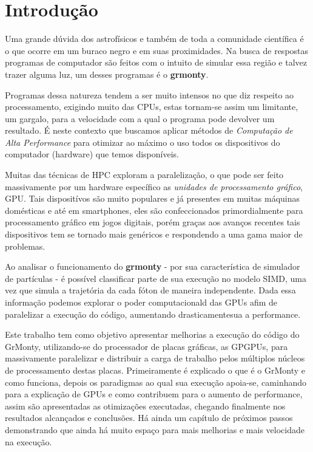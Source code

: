 \chapter{Introdução}
\label{cap:introducao}

Uma grande dúvida dos astrofísicos e também de toda a comunidade científica é o que ocorre em um buraco negro e em suas proximidades. Na busca de respostas programas de computador são feitos com o intuito de simular essa região e talvez trazer alguma luz, um desses programas é o \textbf{grmonty}\citep{Dolence:09}.

Programas dessa natureza tendem a ser muito intensos no que diz respeito ao processamento, exigindo muito das CPUs, estas tornam-se assim um limitante, um gargalo, para a velocidade com a qual o programa pode devolver um resultado. É neste contexto que buscamos aplicar métodos de \emph{Computação de Alta Performance} para otimizar ao máximo o uso todos os dispositivos do computador (hardware) que temos disponíveis.

Muitas das técnicas de HPC exploram a paralelização, o que pode ser feito massivamente por um hardware específico as \emph{unidades de processamento gráfico}, GPU. Tais dispositívos são muito populares e já presentes em muitas máquinas domésticas e até em smartphones, eles são confeccionados primordialmente para processamento gráfico em jogos digitais, porém graças aos avanços recentes tais dispositivos tem se tornado mais genéricos e respondendo a uma gama maior de problemas.

Ao analisar o funcionamento do \textbf{grmonty} - por sua característica de simulador de partículas - é possível classificar parte de sua execução no modelo SIMD, uma vez que simula a trajetória da cada fóton de maneira independente. Dada essa informação podemos explorar o poder computacionald das GPUs afim de paralelizar a execução do código, aumentando drasticamentesua a performance.

Este trabalho tem como objetivo apresentar melhorias a execução do código do GrMonty, utilizando-se do processador de placas gráficas, as GPGPUs, para massivamente paralelizar e distribuir a carga de trabalho pelos múltiplos núcleos de processamento destas placas. Primeiramente é explicado o que é o GrMonty e como funciona, depois os paradigmas ao qual sua execução apoia-se, caminhando para a explicação de GPUs e como contribuem para o aumento de performance, assim são apresentadas as otimizações executadas, chegando finalmente nos resultados alcançados e conclusões. Há ainda um capítulo de próximos passos demonstrando que ainda há muito espaço para mais melhorias e mais velocidade na execução.

